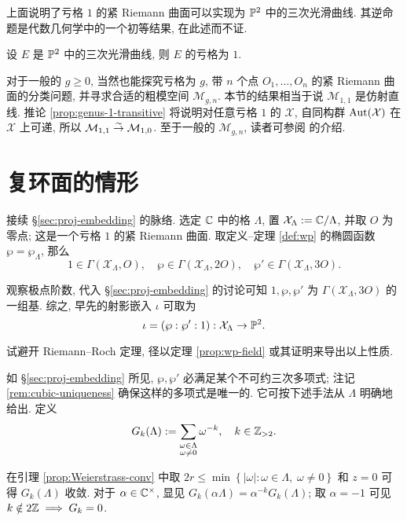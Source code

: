 上面说明了亏格 $1$ 的紧 Riemann 曲面可以实现为 $\mathbb{P}^2$ 中的三次光滑曲线. 其逆命题是代数几何学中的一个初等结果, 在此述而不证.
\begin{theorem}
	设 $E$ 是 $\mathbb{P}^2$ 中的三次光滑曲线, 则 $E$ 的亏格为 $1$.
\end{theorem}

对于一般的 $g \geq 0$, 当然也能探究亏格为 $g$, 带 $n$ 个点 $O_1, \ldots, O_n$ 的紧 Riemann 曲面的分类问题, 并寻求合适的粗模空间 $\mathcal{M}_{g,n}$. 本节的结果相当于说 $\mathcal{M}_{1,1}$ 是仿射直线. 推论 \ref{prop:genus-1-transitive} 将说明对任意亏格 $1$ 的 $\mathcal{X}$, 自同构群 $\operatorname{Aut}(\mathcal{X})$ 在 $\mathcal{X}$ 上可递, 所以 $\mathcal{M}_{1,1} \stackrel{\sim}{\rightarrow} \mathcal{M}_{1,0}$. 至于一般的 $\mathcal{M}_{g,n}$, 读者可参阅 \cite[Appendix, II]{Mum99} 的介绍.

\section{复环面的情形}\label{sec:tori-embedding}
接续 \S\ref{sec:proj-embedding} 的脉络. 选定 $\mathbb{C}$ 中的格 $\Lambda$, 置 $\mathcal{X}_\Lambda := \mathbb{C}/\Lambda$, 并取 $O$ 为零点; 这是一个亏格 $1$ 的紧 Riemann 曲面. 取定义--定理 \ref{def:wp} 的椭圆函数 $\wp = \wp_\Lambda$, 那么
\[ 1 \in \Gamma(\mathcal{X}_\Lambda, O), \quad \wp \in \Gamma(\mathcal{X}_\Lambda, 2 O), \quad \wp' \in \Gamma(\mathcal{X}_\Lambda, 3 O). \]

观察极点阶数, 代入 \S\ref{sec:proj-embedding} 的讨论可知 $1, \wp, \wp'$ 为 $\Gamma(\mathcal{X}_\Lambda, 3 O)$ 的一组基. 综之, 早先的射影嵌入 $\iota$ 可取为
\[ \iota = (\wp : \wp' : 1): \mathcal{X}_\Lambda \to \mathbb{P}^2. \]

\begin{exercise}
	试避开 Riemann--Roch 定理, 径以定理 \ref{prop:wp-field} 或其证明来导出以上性质.
\end{exercise}

如 \S\ref{sec:proj-embedding} 所见, $\wp, \wp'$ 必满足某个不可约三次多项式; 注记 \ref{rem:cubic-uniqueness} 确保这样的多项式是唯一的. 它可按下述手法从 $\Lambda$ 明确地给出. 定义
\[ G_k(\Lambda) := \sum_{\substack{\omega \in \Lambda \\ \omega \neq 0}} \omega^{-k}, \quad k \in \mathbb{Z}_{> 2}. \]

在引理 \ref{prop:Weierstrass-conv} 中取 $2r \leq \min\left\{ |\omega| : \omega \in \Lambda, \; \omega \neq 0 \right\}$ 和 $z = 0$ 可得 $G_k(\Lambda)$ 收敛. 对于 $\alpha \in \mathbb{C}^\times$, 显见 $G_k(\alpha\Lambda) = \alpha^{-k} G_k(\Lambda)$; 取 $\alpha = -1$ 可见 $k \notin 2\mathbb{Z} \implies G_k = 0$.

